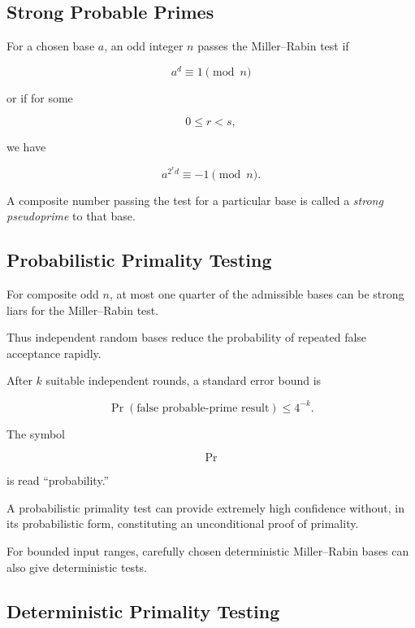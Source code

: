\subsection{Strong Probable Primes}
\label{subsec:strong-probable-primes}

For a chosen base \(a\), an odd integer \(n\) passes the Miller--Rabin test if

\[ a^d\equiv1\pmod n \]

or if for some

\[ 0\leq r<s, \]

we have

\[ a^{2^rd}\equiv-1\pmod n. \]

A composite number passing the test for a particular base is called a
\emph{strong pseudoprime} to that base.

\subsection{Probabilistic Primality Testing}
\label{subsec:probabilistic-primality}

For composite odd \(n\), at most one quarter of the admissible bases can be
strong liars for the Miller--Rabin test.

Thus independent random bases reduce the probability of repeated false
acceptance rapidly.

After \(k\) suitable independent rounds, a standard error bound is

\[ \boxed{\Pr(\text{false probable-prime result})\leq4^{-k}.} \]

The symbol

\[ \Pr \]

is read ``probability.''

\begin{warningbox}
A probabilistic primality test can provide extremely high confidence without,
in its probabilistic form, constituting an unconditional proof of primality.

For bounded input ranges, carefully chosen deterministic Miller--Rabin bases
can also give deterministic tests.
\end{warningbox}

\subsection{Deterministic Primality Testing}
\label{subsec:deterministic-primality}

